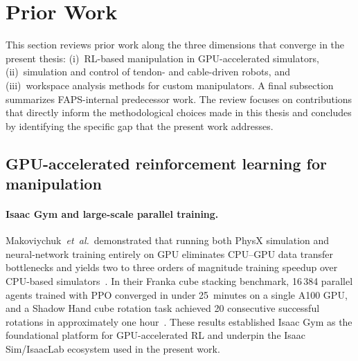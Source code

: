 
\section{Prior Work}\label{sec:prior_work}

This section reviews prior work along the three dimensions that converge in
the present thesis: (i)~\acl{RL}-based manipulation in \ac{GPU}-accelerated
simulators, (ii)~simulation and control of tendon- and cable-driven robots,
and (iii)~workspace analysis methods for custom manipulators.
A final subsection summarizes FAPS-internal predecessor work.
The review focuses on contributions that directly inform the methodological
choices made in this thesis and concludes by identifying the specific gap that
the present work addresses.

\subsection{GPU-accelerated reinforcement learning for manipulation}
\label{subsec:prior_gpu_rl}

\paragraph{Isaac Gym and large-scale parallel training.}
Makoviychuk~\emph{et~al.}\ demonstrated that running both PhysX simulation and
neural-network training entirely on GPU eliminates CPU--GPU data transfer
bottlenecks and yields two to three orders of magnitude training speedup
over CPU-based simulators~\cite{Makoviychuk2021IsaacGym}.
In their Franka cube stacking benchmark, 16\,384 parallel agents trained with
\ac{PPO} converged in under 25~minutes on a single A100 GPU, and a Shadow Hand
cube rotation task achieved 20 consecutive successful rotations in
approximately one hour~\cite{Makoviychuk2021IsaacGym}.
These results established Isaac Gym as the foundational platform for
GPU-accelerated \ac{RL} and underpin the Isaac Sim/IsaacLab ecosystem
used in the present work.

